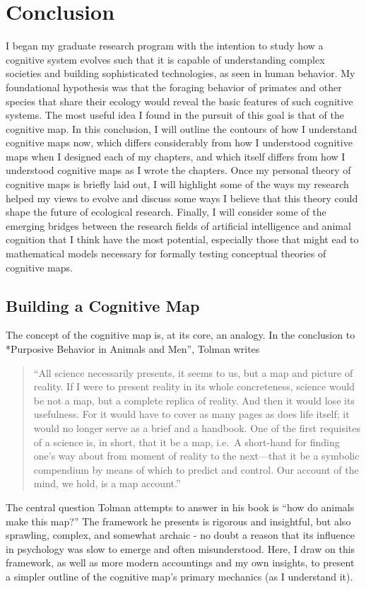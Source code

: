 \documentclass[twoside,12pt,final]{ucthesis-CA2012}
\begin{document}
\begin{ucmainmatter}
\hypertarget{conclusion}{%
\chapter*{Conclusion}\label{conclusion}}

I began my graduate research program with the intention to study how a cognitive system evolves such that it is capable of understanding complex societies and building sophisticated technologies, as seen in human behavior. My foundational hypothesis was that the foraging behavior of primates and other species that share their ecology would reveal the basic features of such cognitive systems. The most useful idea I found in the pursuit of this goal is that of the cognitive map. In this conclusion, I will outline the contours of how I understand cognitive maps now, which differs considerably from how I understood cognitive maps when I designed each of my chapters, and which itself differs from how I understood cognitive maps as I wrote the chapters. Once my personal theory of cognitive maps is briefly laid out, I will highlight some of the ways my research helped my views to evolve and discuss some ways I believe that this theory could shape the future of ecological research. Finally, I will consider some of the emerging bridges between the research fields of artificial intelligence and animal cognition that I think have the most potential, especially those that might ead to mathematical models necessary for formally testing conceptual theories of cognitive maps.

\hypertarget{building-a-cognitive-map}{%
\section{Building a Cognitive Map}\label{building-a-cognitive-map}}

The concept of the cognitive map is, at its core, an analogy. In the conclusion to *Purposive Behavior in Animals and Men'', Tolman writes
\begin{quote}
``All science necessarily presents, it seems to us, but a map and picture of reality. If I were to present reality in its whole concreteness, science would be not a map, but a complete replica of reality. And then it would lose its usefulness. For it would have to cover as many pages as does life itself; it would no longer serve as a brief and a handbook. One of the first requisites of a science is, in short, that it be a map, i.e.~A short-hand for finding one's way about from moment of reality to the next---that it be a symbolic compendium by means of which to predict and control.
Our account of the mind, we hold, is a map account.''
\end{quote}
The central question Tolman attempts to answer in his book is ``how do animals make this map?'' The framework he presents is rigorous and insightful, but also sprawling, complex, and somewhat archaic - no doubt a reason that its influence in psychology was slow to emerge and often misunderstood. Here, I draw on this framework, as well as more modern accountings and my own insights, to present a simpler outline of the cognitive map's primary mechanics (as I understand it).


\end{ucmainmatter}
\end{document}

